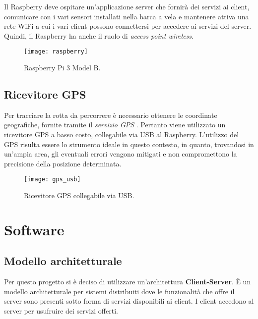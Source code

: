 Il Raspberry deve ospitare un'applicazione server che fornirà dei servizi ai client, comunicare con i vari sensori installati nella barca a vela e mantenere attiva una rete WiFi a cui i vari client possono connettersi per accedere ai servizi del server. Quindi, il Raspberry ha anche il ruolo di \textit{access point wireless}.

\begin{figure}
	\begin{center}
		\texttt{[image: raspberry]}
		\caption[Raspberry Pi 3 Model B]{Raspberry Pi 3 Model B.}
		\label{figura:raspberry}
	\end{center}
\end{figure}

\newpage
\subsection{Ricevitore GPS}
Per tracciare la rotta da percorrere è necessario ottenere le coordinate geografiche, fornite tramite il \textit{servizio GPS} \cite{gps}. Pertanto viene utilizzato un ricevitore GPS a basso costo, collegabile via USB al Raspberry. L'utilizzo del GPS risulta essere lo strumento ideale in questo contesto, in quanto, trovandosi in un'ampia area, gli eventuali errori vengono mitigati e non compromettono la precisione della posizione determinata.
\begin{figure}
	\begin{center}
		\texttt{[image: gps\_usb]}
		\caption[Ricevitore GPS]{Ricevitore GPS collegabile via USB.}
		\label{figura:gps_usb}
	\end{center}
\end{figure}

\section{Software}
\subsection{Modello architetturale}
Per questo progetto si è deciso di utilizzare un'architettura \textbf{Client-Server}. È un modello architetturale per sistemi distribuiti dove le funzionalità che offre il server sono presenti sotto forma di servizi disponibili ai client. I client accedono al server per usufruire dei servizi offerti.

